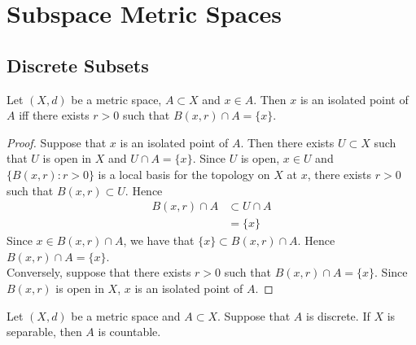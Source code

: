 \documentclass{book}
\begin{document}
\newpage
\section{Subspace Metric Spaces}

\subsection{Discrete Subsets}

\begin{ex}
	Let $(X, d)$ be a metric space, $A \subset X$ and $x \in A$. Then $x$ is an isolated point of $A$ iff there exists $r > 0$ such that $B(x, r) \cap A = \{x\}$. 
\end{ex}

\begin{proof}
	Suppose that $x$ is an isolated point of $A$. Then there exists $U \subset X$ such that $U$ is open in $X$ and $U \cap A = \{x\}$. Since $U$ is open, $x \in U$ and $\{B(x, r): r > 0\}$ is a local basis for the topology on $X$ at $x$, there exists $r > 0$ such that $B(x, r) \subset U$. Hence 
	\begin{align*}
		B(x, r) \cap A 
		& \subset U \cap A \\
		& = \{x\}
	\end{align*}
	Since $x \in B(x, r) \cap A$, we have that $\{x\} \subset B(x, r) \cap A$. Hence $B(x, r) \cap A = \{x\}$. \\
	Conversely, suppose that there exists $r > 0$ such that $B(x, r) \cap A = \{x\}$. Since $B(x, r)$ is open in $X$, $x$ is an isolated point of $A$. 
\end{proof}

\begin{ex}
	Let $(X, d)$ be a metric space and $A \subset X$. Suppose that $A$ is discrete. If $X$ is separable, then $A$ is countable. \\
\end{ex}
\end{document}
